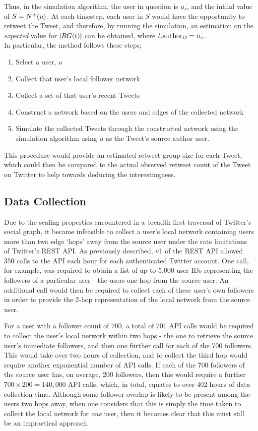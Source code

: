 Thus, in the simulation algorithm, the user in question is $u_s$, and the intiial value of $S = N^+(u)$. At each timestep, each user in $S$ would have the opportunity to retweet the Tweet, and therefore, by running the simulation, an estimation on the \textit{expected} value for $|RG(t)|$ can be obtained, where $t.\textrm{author}_O = u_s$.\\
In particular, the method follows these steps;
\begin{enumerate}
    \item Select a user, $u$
    \item Collect that user's local follower network 
    \item Collect a set of that user's recent Tweets
    \item Construct a network based on the users and edges of the collected network
    \item Simulate the collected Tweets through the constructed network using the simulation algorithm using $u$ as the Tweet's source author user.
\end{enumerate}

This procedure would provide an estimated retweet group size for each Tweet, which could then be compared to the actual observed retweet count of the Tweet on Twitter to help towards deducing the interestingness.


\subsection{Data Collection}
Due to the scaling properties encountered in a breadth-first traversal of Twitter's social graph, it became infeasible to collect a user's local network containing users more than two edge `hops' away from the source user under the rate limitations of Twitter's REST API. As previously described, v1 of the REST API allowed 350 calls to the API each hour for each authenticated Twitter account. One call, for example, was required to obtain a list of up to 5,000 user IDs representing the followers of a particular user - the users one hop from the source user. An additional call would then be required to collect each of these user's own followers in order to provide the 2-hop representation of the local network from the source user.

For a user with a follower count of 700, a total of 701 API calls would be required to collect the user's local network within two hops - the one to retrieve the source user's immediate followers, and then one further call for each of the 700 followers. This would take over two hours of collection, and to collect the third hop would require another exponential number of API calls. If each of the 700 followers of the source user has, on average, 200 followers, then this would require  a further $700 \times 200 = 140,000$ API calls, which, in total, equates to over 402 hours of data collection time. Although some follower overlap is likely to be present among the users two hops away, when one considers that this is simply the time taken to collect the local network for \textit{one} user, then it becomes clear that this must still be an impractical approach.

